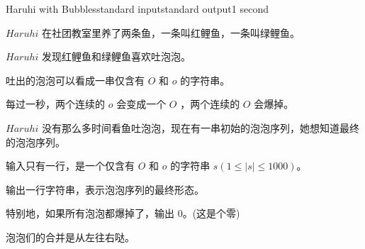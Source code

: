 \begin{problem}{Haruhi with Bubbles}{standard input}{standard output}{1 second}

$Haruhi$ 在社团教室里养了两条鱼，一条叫红鲤鱼，一条叫绿鲤鱼。

$Haruhi$ 发现红鲤鱼和绿鲤鱼喜欢吐泡泡。

吐出的泡泡可以看成一串仅含有 $O$ 和 $o$ 的字符串。

每过一秒，两个连续的 $o$ 会变成一个 $O$ ，两个连续的 $O$ 会爆掉。

$Haruhi$ 没有那么多时间看鱼吐泡泡，现在有一串初始的泡泡序列，她想知道最终的泡泡序列。

\InputFile

输入只有一行，是一个仅含有 $O$ 和 $o$ 的字符串 $s(1 \leq |s| \leq 1000)$。

\OutputFile

输出一行字符串，表示泡泡序列的最终形态。

特别地，如果所有泡泡都爆掉了，输出 $0$。(这是个零)

\Examples
\begin{example}
%
\end{example}

\Note

泡泡们的合并是从左往右哒。

\end{problem}

